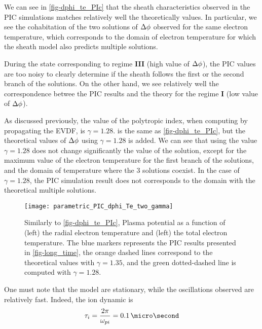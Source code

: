     We can see in \cref{fig-dphi_te_PIc} that the sheath characteristics observed in the \ac{PIC}  simulations matches relatively well the theoretically values.
    In particular, we see the cohabitation of the two solutions of $\Delta \phi$ observed for the same electron temperature, which corresponds to the domain of electron temperature for which the sheath model also predicts multiple solutions.
    
    During the state corresponding to regime {\bf III} (high value of  $\Delta \phi$), the \ac{PIC} values are too noisy to clearly determine if the sheath follows the first or the second branch of the solutions.
    On the other hand, we see relatively well the correspondence betwee the \ac{PIC} results and the theory for the regime {\bf I} (low value of $\Delta \phi$).
    
    As discussed previously, the value of the polytropic index, when computing by propagating the \ac{EVDF}, is $\gamma=1.28$.
     is the same as \cref{fig-dphi_te_PIc}, but  the theoretical values of $\Delta \phi$ using $\gamma=1.28$ is added.
    We can see that using the value $\gamma=1.28$ does not change significantly the value of the solution, except for the maximum value of the electron temperature for the first branch of the solutions, and the domain of temperature where the 3 solutions coexist.
    In the case of $\gamma=1.28$, the \ac{PIC} simulation result does not corresponds to the domain with the theoretical multiple solutions.
    
    \begin{figure}[hbtp]
      \centering
      \texttt{[image: parametric\_PIC\_dphi\_Te\_two\_gamma]}
      \caption{Similarly to \cref{fig-dphi_te_PIc}, Plasma potential as a function of (left) the radial electron temperature and (left) the total electron temperature. The blue markers represents the \ac{PIC} results presented in \cref{fig-long_time}, the orange dashed lines correspond to the theoretical values with $\gamma=1.35$, and the green dotted-dashed line is computed with $\gamma=1.28$.}
      \label{fig-dphi_te_PIc2}
    \end{figure}
    
    One must note that the model are stationary, while the oscillations observed are relatively fast.
    Indeed, the ion dynamic is 
    \begin{equation} \label{eq-ti}
      \tau_i = \frac{2 \pi}{\opi} = 0.1 \,\micro\second
    \end{equation}
    
